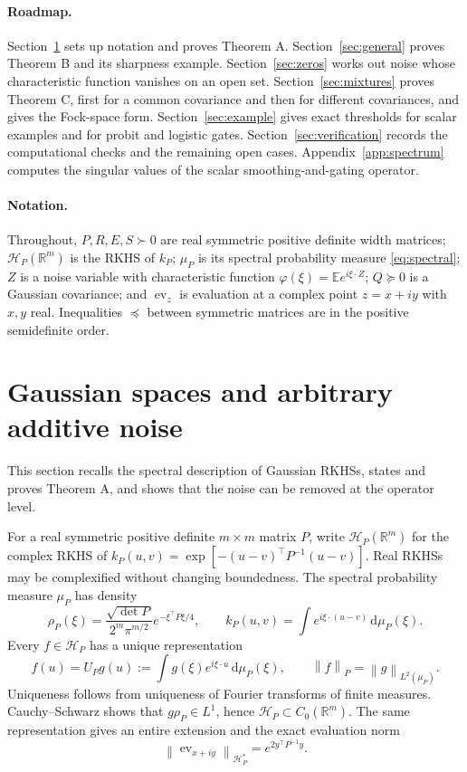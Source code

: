 \documentclass[11pt,a4paper]{article}
\theoremstyle{remark}
\newcommand{\R}{\mathbb R}
\newcommand{\E}{\mathbb E}
\newcommand{\HH}{\mathcal H}
\newcommand{\dd}{\,\mathrm d}
\newcommand{\norm}[1]{\left\lVert#1\right\rVert}
\begin{document}
\paragraph{Roadmap.}
Section~\ref{sec:main} sets up notation and proves Theorem A.
Section~\ref{sec:general} proves Theorem B and its sharpness example.
Section~\ref{sec:zeros} works out noise whose characteristic function
vanishes on an open set. Section~\ref{sec:mixtures} proves Theorem C,
first for a common covariance and then for different covariances, and
gives the Fock-space form. Section~\ref{sec:example} gives exact
thresholds for scalar examples and for probit and logistic gates.
Section~\ref{sec:verification} records the computational checks and the
remaining open cases. Appendix~\ref{app:spectrum} computes the singular
values of the scalar smoothing-and-gating operator.

\paragraph{Notation.}
Throughout, $P,R,E,S\succ0$ are real symmetric positive definite width
matrices; $\HH_P(\R^m)$ is the RKHS of $k_P$; $\mu_P$ is its spectral
probability measure \eqref{eq:spectral}; $Z$ is a noise variable with
characteristic function $\varphi(\xi)=\E e^{i\xi\cdot Z}$; $Q\succeq0$
is a Gaussian covariance; and $\operatorname{ev}_z$ is evaluation at a
complex point $z=x+iy$ with $x,y$ real. Inequalities $\preceq$ between
symmetric matrices are in the positive semidefinite order.

\section{Gaussian spaces and arbitrary additive noise}\label{sec:main}

This section recalls the spectral description of Gaussian RKHSs, states
and proves Theorem A, and shows that the noise can be removed at the
operator level.

For a real symmetric positive definite $m\times m$ matrix $P$, write
$\HH_P(\R^m)$ for the complex RKHS of
$k_P(u,v)=\exp[-(u-v)^\top P^{-1}(u-v)]$. Real RKHSs may be complexified
without changing boundedness. The spectral probability measure $\mu_P$
has density
\begin{equation}\label{eq:spectral}
 \rho_P(\xi)=\frac{\sqrt{\det P}}{2^m\pi^{m/2}}
                  e^{-\xi^\top P\xi/4},
 \qquad
 k_P(u,v)=\int e^{i\xi\cdot(u-v)}\dd\mu_P(\xi).
\end{equation}
Every $f\in\HH_P$ has a unique representation
\begin{equation}\label{eq:feature}
 f(u)=U_Pg(u):=\int g(\xi)e^{i\xi\cdot u}\dd\mu_P(\xi),
 \qquad \norm{f}_P=\norm{g}_{L^2(\mu_P)}.
\end{equation}
Uniqueness follows from uniqueness of Fourier transforms of finite
measures. Cauchy--Schwarz shows that $g\rho_P\in L^1$, hence
$\HH_P\subset C_0(\R^m)$. The same representation gives an entire
extension and the exact evaluation norm
\begin{equation}\label{eq:evaluation}
 \norm{\operatorname{ev}_{x+iy}}_{\HH_P^*}
       =e^{2y^\top P^{-1}y}.
\end{equation}
\end{document}
